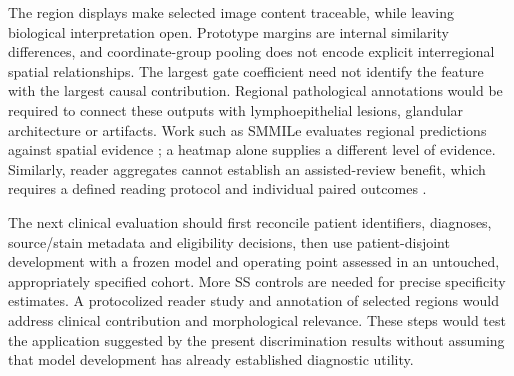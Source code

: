 The region displays make selected image content traceable, while leaving biological interpretation open. Prototype margins are internal similarity differences, and coordinate-group pooling does not encode explicit interregional spatial relationships. The largest gate coefficient need not identify the feature with the largest causal contribution. Regional pathological annotations would be required to connect these outputs with lymphoepithelial lesions, glandular architecture or artifacts. Work such as SMMILe evaluates regional predictions against spatial evidence \citep{ref27}; a heatmap alone supplies a different level of evidence. Similarly, reader aggregates cannot establish an assisted-review benefit, which requires a defined reading protocol and individual paired outcomes \citep{ref21,ref22}.

The next clinical evaluation should first reconcile patient identifiers, diagnoses, source/stain metadata and eligibility decisions, then use patient-disjoint development with a frozen model and operating point assessed in an untouched, appropriately specified cohort. More SS controls are needed for precise specificity estimates. A protocolized reader study and annotation of selected regions would address clinical contribution and morphological relevance. These steps would test the application suggested by the present discrimination results without assuming that model development has already established diagnostic utility.
